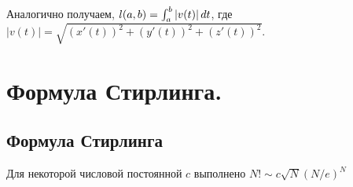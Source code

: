 \documentclass[a4paper]{article}
\theoremstyle{named}
\renewcommand{\int}{\intop}
\begin{document}
        Аналогично получаем, $l(a, b) = \int_a^b |v(t)| \dd t$, где $|v(t)| = \sqrt{(x'(t))^2 + (y'(t))^2 + (z'(t))^2}$.

    \section{Формула Стирлинга.}

   		\subsection{Формула Стирлинга}

   		\begin{theorem*}
   			Для некоторой числовой постоянной $c$ выполнено $N! \sim c \sqrt{N} (N / e)^N$
   		\end{theorem*}
\end{document}
